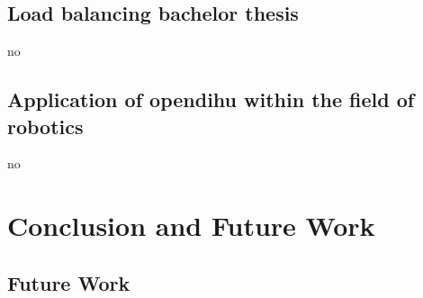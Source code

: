 \section{Load balancing bachelor thesis}
no
\section{Application of opendihu within the field of robotics} 
no

\chapter{Conclusion and Future Work}\label{sec:conclusion_and_future_work}

\section{Future Work}\label{sec:future_work}
 


\fi


